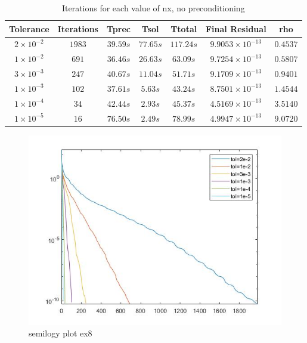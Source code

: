 \documentclass[a4paper, 11pt]{article}
\begin{document}
		\begin{table}[H]
			\centering
			\begin{tabular}{c|c|c|c|c|c|c}
				\textbf{Tolerance} & \textbf{Iterations} & \textbf{Tprec}  & \textbf{Tsol}  & \textbf{Ttotal} & \textbf{Final Residual} & \textbf{rho} \\ \hline
				$2 \times 10^{-2}$ & $1983$	& $ 39.59 s $ 	& $ 77.65 s $ & $ 117.24 s $ 	& $ 9.9053 \times 10^{-13} $ & $ 0.4537 $\\ \hline
				$1 \times 10^{-2}$ & $691$	& $ 36.46 s $ 	& $ 26.63 s $ & $ 63.09 s $ 	& $ 9.7254 \times 10^{-13} $ & $ 0.5807 $\\ \hline
				$3 \times 10^{-3}$ & $247$	& $ 40.67 s $ 	& $ 11.04 s $ & $ 51.71 s $ 	& $ 9.1709 \times 10^{-13} $ & $ 0.9401 $\\ \hline
				$1 \times 10^{-3}$ & $102$	& $ 37.61 s $ 	& $ 5.63 s $ & $ 43.24 s $ 		& $ 8.7501 \times 10^{-13} $ & $ 1.4544 $\\ \hline
				$1 \times 10^{-4}$ & $34$	& $ 42.44 s $ 	& $ 2.93 s $ & $ 45.37 s $ 		& $ 4.5169 \times 10^{-13} $ & $ 3.5140 $\\ \hline
				$1 \times 10^{-5}$ & $16$	& $ 76.50 s $ 	& $ 2.49 s $ & $ 78.99 s $ 		& $ 4.9947 \times 10^{-13} $ & $ 9.0720 $\\ \hline
			\end{tabular}
			\caption{Iterations for each value of nx, no preconditioning}
			\label{table:ex8}
		\end{table}
	
		
		
		\begin{figure}[H]
			\centering
			\includegraphics[width=.6\linewidth]{ex8.jpg}
			\caption{semilogy plot ex8}
			\label{fig:ex8}
		\end{figure}
	
	
	
\end{document}

